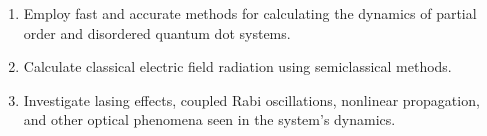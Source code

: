 \begin{enumerate}\compresslist
\item Employ fast and accurate methods for calculating the dynamics of partial order and disordered quantum dot systems.
\item Calculate classical electric field radiation using semiclassical methods.
\item Investigate lasing effects, coupled Rabi oscillations, nonlinear propagation, and other optical phenomena seen in the system's dynamics. 
\end{enumerate}

\vspace{0.3em} %

